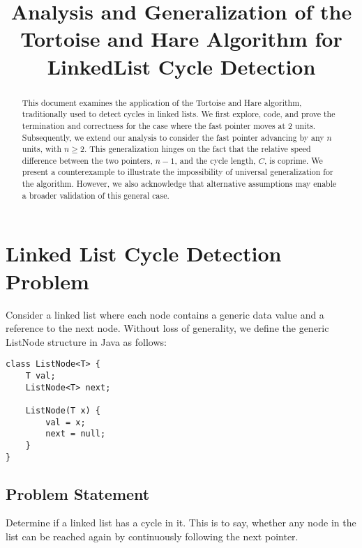 \documentclass{article}
\title{Analysis and Generalization of the Tortoise and Hare Algorithm for LinkedList Cycle Detection}
\begin{document}
\maketitle

\begin{abstract}
This document examines the application of the Tortoise and Hare algorithm, traditionally used to detect cycles in linked lists. We first explore, code, and prove the termination and correctness for the case where the fast pointer moves at 2 units. Subsequently, we extend our analysis to consider the fast pointer advancing by any \( n \) units, with \( n \geq 2 \). This generalization hinges on the fact that the relative speed difference between the two pointers, \( n-1 \), and the cycle length, \( C \), is coprime. We present a counterexample to illustrate the impossibility of universal generalization for the algorithm. However, we also acknowledge that alternative assumptions may enable a broader validation of this general case.
\end{abstract}



\section*{Linked List Cycle Detection Problem}


Consider a linked list where each node contains a generic data value and a reference to the next node. Without loss of generality, we define the generic ListNode structure in Java as follows:
\begin{verbatim}
class ListNode<T> {
    T val;
    ListNode<T> next;

    ListNode(T x) {
        val = x;
        next = null;
    }
}
\end{verbatim}

\subsection*{Problem Statement}
Determine if a linked list has a cycle in it. This is to say, whether any node in the list can be reached again by continuously following the next pointer.
\end{document}
